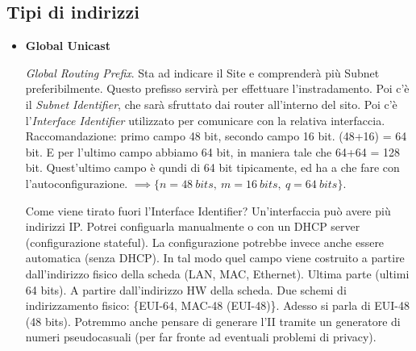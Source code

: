 \subsection{Tipi di indirizzi}

\begin{itemize}
\item{\textbf{Global Unicast}}

\textit{Global Routing Prefix}. Sta ad indicare il Site e comprenderà più Subnet preferibilmente. Questo prefisso servirà per effettuare l'instradamento. Poi c'è il \textit{Subnet Identifier}, che sarà sfruttato dai router all'interno del sito. Poi c'è l'\textit{Interface Identifier} utilizzato per comunicare con la relativa interfaccia. Raccomandazione: primo campo 48 bit, secondo campo 16 bit. (48+16) = 64 bit. E per l'ultimo campo abbiamo 64 bit, in maniera tale che 64+64 = 128 bit. Quest'ultimo campo è qundi di 64 bit tipicamente, ed ha a che fare con l'autoconfigurazione. $\implies \{n = 48\ bits,\ m = 16\ bits,\ q = 64\ bits\}$.

Come viene tirato fuori l'Interface Identifier? Un'interfaccia può avere più indirizzi IP. Potrei configuarla manualmente o con un DHCP server (configurazione stateful). La configurazione potrebbe invece anche essere automatica (senza DHCP). In tal modo quel campo viene costruito a partire dall'indirizzo fisico della scheda (LAN, MAC, Ethernet). Ultima parte (ultimi 64 bits). A partire dall'indirizzo HW della scheda. Due schemi di indirizzamento fisico: \{EUI-64, MAC-48 (EUI-48)\}. Adesso si parla di EUI-48 (48 bits). Potremmo anche pensare di generare l'II tramite un generatore di numeri pseudocasuali (per far fronte ad eventuali problemi di privacy). 


\end{itemize}
